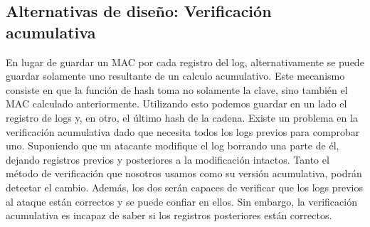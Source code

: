 \subsection{Alternativas de diseño: Verificación acumulativa}
En lugar de guardar un MAC por cada registro del log, alternativamente se puede guardar solamente uno resultante de un calculo acumulativo. Este mecanismo consiste en que la función de hash toma no solamente la clave, sino también el MAC calculado anteriormente. 
Utilizando esto podemos guardar en un lado el registro de logs y, en otro, el último hash de la cadena. 
Existe un problema en la verificación acumulativa dado que necesita todos los logs previos para comprobar uno. Suponiendo que un atacante modifique el log borrando una parte de él, dejando registros previos y posteriores a la modificación intactos. Tanto el método de verificación que nosotros usamos como su versión acumulativa, podrán detectar el cambio. Además, los dos serán capaces de verificar que los logs previos al ataque están correctos y se puede confiar en ellos. Sin embargo, la verificación acumulativa es incapaz de saber si los registros posteriores están correctos.   
